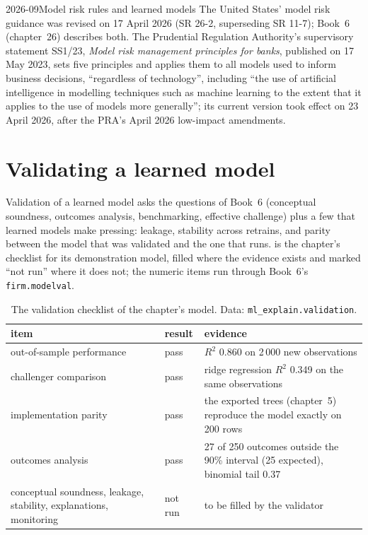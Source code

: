 \begin{dated}{2026-09}{Model risk rules and learned models}\label{dat:ml:interpretability-and-model-governance:rules}
The United States' model risk guidance was revised on 17 April 2026 (SR 26-2, superseding SR 11-7); Book~6 (chapter~26)
describes both. The Prudential Regulation Authority's supervisory statement SS1/23, \emph{Model risk management principles for
banks}, published on 17 May 2023, sets five principles and applies them to all models used to inform business decisions,
``regardless of technology'', including ``the use of artificial intelligence in modelling techniques such as machine learning
to the extent that it applies to the use of models more generally''; its current version took effect on 23 April 2026,
after the PRA's April 2026 low-impact amendments.
\end{dated}

\section{Validating a learned model}

Validation of a learned model asks the questions of Book~6 (conceptual soundness, outcomes analysis, benchmarking,
effective challenge) plus a few that learned models make pressing: leakage, stability across retrains, and parity between the
model that was validated and the one that runs.  is the chapter's checklist for its demonstration
model, filled where the evidence exists and marked ``not run'' where it does not; the numeric items run through Book~6's
\texttt{firm.modelval}.

\begin{table}[htbp]
\centering\small
\begin{tabular}{@{}p{4.3cm}lp{7.0cm}@{}}
\toprule
item & result & evidence\\
\midrule
out-of-sample performance & pass & $R^2$ 0.860 on 2\,000 new observations\\
challenger comparison & pass & ridge regression $R^2$ 0.349 on the same observations\\
implementation parity & pass & the exported trees (chapter~5) reproduce the model exactly on 200 rows\\
outcomes analysis & pass & 27 of 250 outcomes outside the 90\% interval (25 expected), binomial tail 0.37\\
conceptual soundness, leakage, stability, explanations, monitoring & not run & to be filled by the validator\\
\bottomrule
\end{tabular}
\caption{The validation checklist of the chapter's model. Data: \texttt{ml\_explain.validation}.}\label{tab:ml:gov:checklist}
\end{table}

